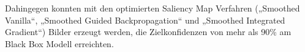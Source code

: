Dahingegen konnten mit den optimierten Saliency Map Verfahren („Smoothed Vanilla“, „Smoothed Guided Backpropagation“ und „Smoothed Integrated Gradient“) Bilder erzeugt werden, die Zielkonfidenzen von mehr als 90\% am Black Box Modell erreichten.

%
%


